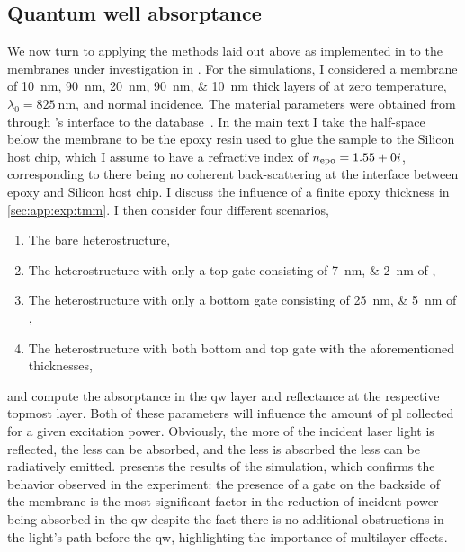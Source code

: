 \subsection{Quantum well absorptance}\label{subsec:exp:tmm:absorptance}
We now turn to applying the methods laid out above as implemented in \pymoosh to the membranes under investigation in \thethesis.
For the simulations, I considered a membrane of \qtylist[list-units = single, list-separator = {/}, list-final-separator = {/}]{10;90;20;90;10}{\nano\meter} thick layers of  at zero temperature, $\lambda_0 = \qty{825}{\nano\meter}$, and normal incidence.
The material parameters were obtained from  through \pymoosh's interface to the  database~\cite{Polyanskiy2024}.
In the main text I take the half-space below the membrane to be the epoxy resin used to glue the sample to the Silicon host chip, which I assume to have a refractive index of $n_{\mathrm{epo}} = 1.55 + 0i$,
corresponding to there being no coherent back-scattering at the interface between epoxy and Silicon host chip.
I discuss the influence of a finite epoxy thickness in \cref{sec:app:exp:tmm}.
I then consider four different scenarios,
\begin{enumerate}
    \item The bare heterostructure,
    \item The heterostructure with only a top gate consisting of \qtylist[list-units = single, list-pair-separator = {/}]{7;2}{\nano\meter} of ,
    \item The heterostructure with only a bottom gate consisting of \qtylist[list-units = single, list-pair-separator = {/}]{25;5}{\nano\meter} of ,
    \item The heterostructure with both bottom and top gate with the aforementioned thicknesses,
\end{enumerate}
and compute the absorptance \absorptance in the \gls{qw} layer and reflectance  at the respective topmost layer.
Both of these parameters will influence the amount of \gls{pl} collected for a given excitation power.
Obviously, the more of the incident laser light is reflected, the less can be absorbed, and the less is absorbed the less can be radiatively emitted.
 presents the results of the simulation, which confirms the behavior observed in the experiment: the presence of a gate on the backside of the membrane is the most significant factor in the reduction of incident power being absorbed in the \gls{qw} despite the fact there is no additional obstructions in the light's path before the \gls{qw}, highlighting the importance of multilayer effects.

